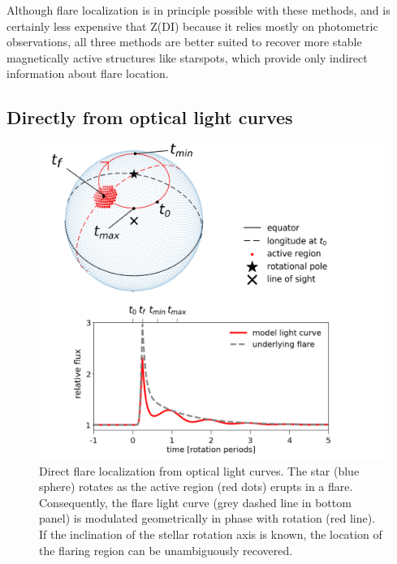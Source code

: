 \documentclass[proof]{WileyASNA-v1}
\newcommand{\jdag}[1]{\textcolor{darkred}{#1}}
\begin{document}
Although flare localization is in principle possible with these methods, and is certainly less expensive that Z(DI) because it relies mostly on photometric observations, all three methods are better suited to recover more stable magnetically active structures like starspots, which provide only indirect information about flare location.

\subsection{Directly from optical light curves}
\label{sec:systematic}


\begin{figure}
    \centering
    \includegraphics[width=\hsize]{model_illustration_annot_xmm_an2.png}
    \caption{Direct flare localization from optical light curves. The star (blue sphere) rotates as the active region (red dots) erupts in a flare. Consequently, the flare light curve (grey dashed line in bottom panel) is modulated geometrically in phase with rotation (red line). If the inclination of the stellar rotation axis is known, the location of the flaring region can be unambiguously recovered.}%
    \label{fig:ilin}
\end{figure}
\end{document}
